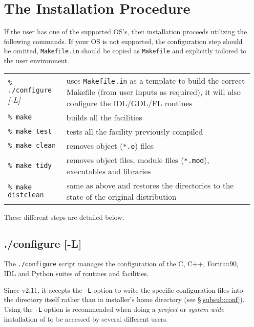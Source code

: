 \documentclass[12pt,twoside]{article}
\begin{document}
\section{The Installation Procedure}

If the user has one of the supported OS's, then installation proceeds utilizing
the following commands. If your OS is not supported, the configuration step
should be omitted, \texttt{Makefile.in} should be copied as \texttt{Makefile} and explicitly
tailored to the user environment.


\begin{flushright}
\begin{tabular}{p{0.3\hsize} p{0.60\hsize}}
\texttt{\% ./configure} {\em [-L]}    & uses \texttt{Makefile.in} as a template to build 
                         the correct Makefile (from user inputs as required), it
                         will also configure the IDL/GDL/FL routines\\
\texttt{\% make}           & builds all the facilities \\
\texttt{\% make test}      & tests all the facility previously compiled \\
\texttt{\% make clean}     & removes object (\texttt{*.o}) files \\
\texttt{\% make tidy}      & removes object files, module files (\texttt{*.mod}), executables and libraries \\
\texttt{\% make distclean} & same as above and restores the directories to the state of the 
                          original distribution \\
\end{tabular}
\end{flushright}
These different steps are detailed below.

\subsection{./configure [-L]}

The \texttt{./configure} script manages the configuration of the C, C++,
Fortran90, IDL and Python suites of routines and facilities.

Since v2.11, it accepts the \texttt{-L} option to write the \healpix specific configuration files
into the \healpix directory itself rather than in installer's home directory (see
\S\ref{subsub:conf}).
Using the \texttt{-L} option is recommended when doing a {\em project} or {\em system wide} installation of
\healpix to be accessed by several different users.
\end{document}
